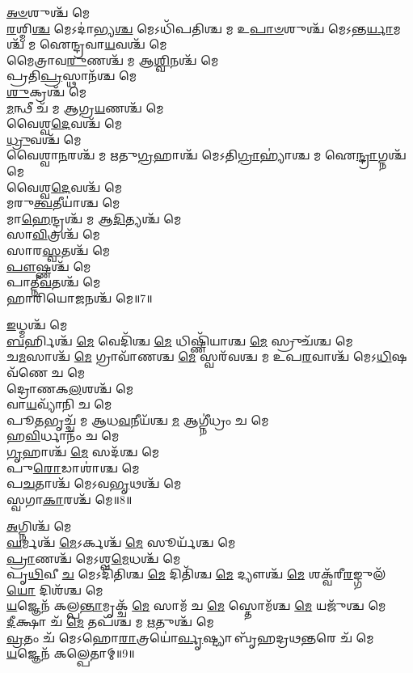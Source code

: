 \-\ul{𑌅}\-\-\ul{𑍞}\-𑌶𑍁𑌶𑍍𑌚᳴ 𑌮𑍇\\
\-\ul{𑌰}\-𑌶𑍍𑌮𑌿\-\ul{𑌶𑍍𑌚} 𑌮𑍇𑌽𑌦𑌾॑𑌭𑍍𑌯\-\ul{𑌶𑍍𑌚} 𑌮𑍇𑌽𑌧𑌿᳴𑌪𑌤𑌿𑌶𑍍𑌚 𑌮 𑌉\-\ul{𑌪𑌾}\-\-\ul{𑍞}\-𑌶𑍁𑌶𑍍𑌚᳴ 𑌮𑍇𑌽𑌨𑍍𑌤\-\ul{𑌰𑍍𑌯𑌾}\-𑌮𑌶𑍍𑌚᳴ 𑌮 𑌐𑌨𑍍𑌦𑍍𑌰𑌵𑌾\-\ul{𑌯}\-𑌵𑌶𑍍𑌚᳴ 𑌮𑍇\\
𑌮𑍈𑌤𑍍𑌰𑌾𑌵\-\ul{𑌰𑍁}\-𑌣𑌶𑍍𑌚᳴ 𑌮 𑌆\-\ul{𑌶𑍍𑌵𑌿}\-𑌨𑌶𑍍𑌚᳴ 𑌮𑍇\\
𑌪𑍍𑌰𑌤𑌿\-\ul{𑌪𑍍𑌰}\-𑌸𑍍𑌥𑌾𑌨᳴𑌶𑍍𑌚 𑌮𑍇\\
\-\ul{𑌶𑍁}\-𑌕𑍍𑌰𑌶𑍍𑌚᳴ 𑌮𑍇\\
\-\ul{𑌮}\-𑌨𑍍𑌥𑍀 𑌚᳴ 𑌮 𑌆𑌗𑍍𑌰\-\ul{𑌯}\-𑌣𑌶𑍍𑌚᳴ 𑌮𑍇\\
𑌵𑍈𑌶𑍍𑌵\-\ul{𑌦𑍇}\-𑌵𑌶𑍍𑌚᳴ 𑌮𑍇\\
\-\ul{𑌧𑍍𑌰𑍁}\-𑌵𑌶𑍍𑌚᳴ 𑌮𑍇\\
𑌵𑍈𑌶𑍍𑌵𑌾\-\ul{𑌨}\-𑌰𑌶𑍍𑌚᳴ 𑌮 𑌋𑌤𑍁\-\ul{𑌗𑍍𑌰}\-𑌹𑌾𑌶𑍍𑌚᳴ 𑌮𑍇𑌽𑌤𑌿\-\ul{𑌗𑍍𑌰𑌾}\-𑌹𑍍𑌯𑌾॑𑌶𑍍𑌚 𑌮 𑌐\-\ul{𑌨𑍍𑌦𑍍𑌰𑌾}\-𑌗𑍍𑌨𑌶𑍍𑌚᳴ 𑌮𑍇\\
𑌵𑍈𑌶𑍍𑌵\-\ul{𑌦𑍇}\-𑌵𑌶𑍍𑌚᳴ 𑌮𑍇\\
𑌮𑌰𑍁\-\ul{𑌤𑍍𑌵}\-𑌤𑍀𑌯𑌾॑𑌶𑍍𑌚 𑌮𑍇\\
𑌮𑌾\-\ul{𑌹𑍇}\-𑌨𑍍𑌦𑍍𑌰𑌶𑍍𑌚᳴ 𑌮 𑌆\-\ul{𑌦𑌿}\-𑌤𑍍𑌯𑌶𑍍𑌚᳴ 𑌮𑍇\\
𑌸𑌾\-\ul{𑌵𑌿}\-𑌤𑍍𑌰𑌶𑍍𑌚᳴ 𑌮𑍇\\
𑌸𑌾𑌰\-\ul{𑌸𑍍𑌵}\-𑌤𑌶𑍍𑌚᳴ 𑌮𑍇\\
\-\ul{𑌪𑍗}\-𑌷𑍍𑌣𑌶𑍍𑌚᳴ 𑌮𑍇\\
𑌪𑌾𑌤𑍍𑌨𑍀\-\ul{𑌵}\-𑌤𑌶𑍍𑌚᳴ 𑌮𑍇\\
𑌹𑌾𑌰𑌿𑌯𑍋\-\ul{𑌜}\-𑌨𑌶𑍍𑌚᳴ 𑌮𑍇॥7॥ 

\-\ul{𑌇}\-𑌧𑍍𑌮𑌶𑍍𑌚᳴ 𑌮𑍇\\
\-\ul{𑌬}\-𑌰𑍍𑌹𑌿𑌶𑍍𑌚᳴ \ul{𑌮𑍇} 𑌵𑍇𑌦𑌿᳴𑌶𑍍𑌚 \ul{𑌮𑍇} 𑌧𑌿𑌷𑍍𑌣𑌿᳴𑌯𑌾𑌶𑍍𑌚 \ul{𑌮𑍇} 𑌸𑍍𑌰𑍁𑌚᳴𑌶𑍍𑌚 𑌮𑍇\\
𑌚\-\ul{𑌮}\-𑌸𑌾𑌶𑍍𑌚᳴ \ul{𑌮𑍇} 𑌗𑍍𑌰𑌾𑌵𑌾᳴𑌣𑌶𑍍𑌚 \ul{𑌮𑍇} 𑌸𑍍𑌵𑌰᳴𑌵𑌶𑍍𑌚 𑌮 𑌉𑌪\-\ul{𑌰}\-𑌵𑌾𑌶𑍍𑌚᳴ 𑌮𑍇𑌽\-\ul{𑌧𑌿}\-𑌷𑌵᳴𑌣𑍇 𑌚 𑌮𑍇\\
𑌦𑍍𑌰𑍋𑌣𑌕\-\ul{𑌲}\-𑌶𑌶𑍍𑌚᳴ 𑌮𑍇\\
𑌵𑌾\-\ul{𑌯}\-𑌵𑍍𑌯𑌾᳴𑌨𑌿 𑌚 𑌮𑍇\\
𑌪𑍂\-\ul{𑌤}\-𑌭𑍃𑌚𑍍𑌚᳴ 𑌮 𑌆𑌧\-\ul{𑌵}\-𑌨𑍀𑌯᳴𑌶𑍍𑌚 \ul{𑌮} 𑌆𑌗𑍍𑌨𑍀॑𑌧𑍍𑌰𑌂 𑌚 𑌮𑍇\\
𑌹\-\ul{𑌵𑌿}\-𑌰𑍍𑌧𑌾𑌨𑌂᳴ 𑌚 𑌮𑍇\\
\-\ul{𑌗𑍃}\-𑌹𑌾𑌶𑍍𑌚᳴ \ul{𑌮𑍇} 𑌸𑌦᳴𑌶𑍍𑌚 𑌮𑍇\\
𑌪𑍁\-\ul{𑌰𑍋}\-𑌡𑌾𑌶𑌾॑𑌶𑍍𑌚 𑌮𑍇\\
𑌪\-\ul{𑌚}\-𑌤𑌾𑌶𑍍𑌚᳴ 𑌮𑍇𑌽𑌵\-\ul{𑌭𑍃}\-𑌥𑌶𑍍𑌚᳴ 𑌮𑍇\\
𑌸𑍍𑌵𑌗𑌾\-\ul{𑌕𑌾}\-𑌰𑌶𑍍𑌚᳴ 𑌮𑍇॥8॥ 

\-\ul{𑌅}\-𑌗𑍍𑌨𑌿𑌶𑍍𑌚᳴ 𑌮𑍇\\
\-\ul{𑌘}\-𑌰𑍍𑌮𑌶𑍍𑌚᳴ \ul{𑌮𑍇}\-𑌽𑌰𑍍𑌕𑌶𑍍𑌚᳴ \ul{𑌮𑍇} 𑌸𑍂𑌰𑍍𑌯᳴𑌶𑍍𑌚 𑌮𑍇\\
\-\ul{𑌪𑍍𑌰𑌾}\-𑌣𑌶𑍍𑌚᳴ 𑌮𑍇𑌽𑌶𑍍𑌵\-\ul{𑌮𑍇}\-𑌧𑌶𑍍𑌚᳴ 𑌮𑍇\\
𑌪𑍃\-\ul{𑌥𑌿}\-𑌵𑍀 \ul{𑌚} 𑌮𑍇𑌽𑌦𑌿᳴𑌤𑌿𑌶𑍍𑌚 \ul{𑌮𑍇} 𑌦𑌿𑌤𑌿᳴𑌶𑍍𑌚 \ul{𑌮𑍇} 𑌦𑍍𑌯𑍗𑌶𑍍𑌚᳴ \ul{𑌮𑍇} 𑌶𑌕𑍍𑌵᳴𑌰𑍀\-\ul{𑌰}\-𑌙𑍍𑌗𑍁𑌲᳴\-\ul{𑌯𑍋} 𑌦𑌿𑌶᳴𑌶𑍍𑌚 𑌮𑍇\\
\-\ul{𑌯}\-𑌜𑍍𑌞𑍇𑌨᳴ 𑌕𑌲𑍍𑌪\-\ul{𑌨𑍍𑌤𑌾}\-𑌮𑍃𑌕𑍍𑌚᳴ \ul{𑌮𑍇} 𑌸𑌾𑌮᳴ 𑌚 \ul{𑌮𑍇} 𑌸𑍍𑌤𑍋𑌮᳴𑌶𑍍𑌚 \ul{𑌮𑍇} 𑌯𑌜𑍁᳴𑌶𑍍𑌚 𑌮𑍇\\
\-\ul{𑌦𑍀}\-𑌕𑍍𑌷𑌾 𑌚᳴ \ul{𑌮𑍇} 𑌤𑌪᳴𑌶𑍍𑌚 𑌮 \ul{𑌋}\-𑌤𑍁𑌶𑍍𑌚᳴ 𑌮𑍇\\
\-\ul{𑌵𑍍𑌰}\-𑌤𑌂 𑌚᳴ 𑌮𑍇𑌽𑌹𑍋\-\ul{𑌰𑌾}\-𑌤𑍍𑌰𑌯𑍋॑\-\ul{𑌰𑍍𑌵𑍃}\-𑌷𑍍𑌟𑍍𑌯𑌾 𑌬𑍃᳴𑌹𑌦𑍍𑌰𑌥\-\ul{𑌨𑍍𑌤}\-𑌰𑍇 𑌚᳴ 𑌮𑍇\\
\-\ul{𑌯}\-𑌜𑍍𑌞𑍇𑌨᳴ 𑌕𑌲𑍍𑌪𑍇𑌤𑌾𑌮𑍍॥9॥ 

